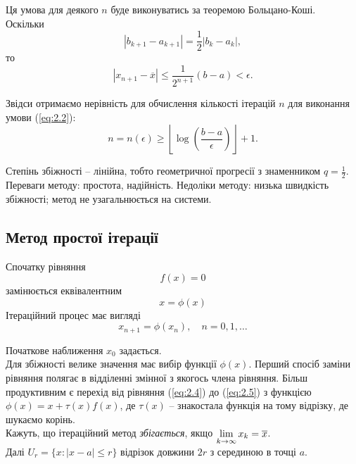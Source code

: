 Ця умова для деякого $n$ буде виконуватись за теоремою Больцано-Коші. \\

Оскільки
\[ |b_{k + 1} - a_{k + 1} | = \dfrac12 |b_k - a_k|, \]
то
\begin{equation}
	\label{eq:2.3}
	|x_{n+1} - \overline{x}| \le \dfrac{1}{2^{n+1}} (b - a) < \epsilon.
\end{equation}

Звідси отримаємо нерівність для обчислення кількості ітерацій $n$ для виконання умови (\ref{eq:2.2}):
\[ n = n(\epsilon) \ge \left\lfloor \log\left(\dfrac{b-a}{\epsilon}\right) \right\rfloor + 1. \]

Степінь збіжності -- лінійна, тобто геометричної прогресії з знаменником $q = \frac12$. \\

Переваги методу: простота, надійність. Недоліки методу: низька швидкість збіжності; метод не узагальнюється на системи. 

\subsection{Метод простої ітерації}

Спочатку рівняння
\begin{equation}
	\label{eq:2.4}
	f (x) = 0
\end{equation}
замінюється еквівалентним
\begin{equation}
	\label{eq:2.5}
	x = \phi(x)
\end{equation}
Ітераційний процес має вигляді
\begin{equation}
	\label{eq:2.6}
	x_{n+1} = \phi(x_n), \quad n = 0,1,\ldots
\end{equation}

Початкове наближення $x_0$ задається. \\

Для збіжності велике значення має вибір функції $\phi(x)$. Перший спосіб заміни рівняння полягає в відділенні змінної з якогось члена рівняння. Більш продуктивним є перехід від рівняння (\ref{eq:2.4}) до (\ref{eq:2.5}) з функцією $\phi (x) = x + \tau (x) f (x)$, де $\tau (x)$ -- знакостала функція на тому відрізку, де шукаємо корінь. \\

Кажуть, що ітераційний метод \textit{збігається}, якщо $\displaystyle\lim\limits_{k\to\infty} x_k = \overline{x}$. \\

Далі $U_r = \{x : |x - a| \le r\}$ відрізок довжини $2r$ з серединою в точці $a$. \\

